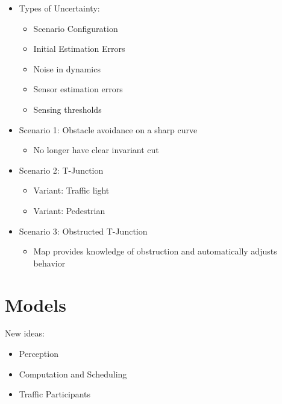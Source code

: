 \documentclass{easychair}
\begin{document}
	
	\begin{itemize}
		\item Types of Uncertainty:
		\begin{itemize}
			\item Scenario Configuration
			\item Initial Estimation Errors
			\item Noise in dynamics
			\item Sensor estimation errors
			\item Sensing thresholds
		\end{itemize}
	\end{itemize}
	\begin{itemize}
		\item Scenario 1: Obstacle avoidance on a sharp curve
		\begin{itemize}
			\item No longer have clear invariant cut
		\end{itemize}
		\item Scenario 2: T-Junction
		\begin{itemize}
			\item Variant: Traffic light
			\item Variant: Pedestrian
		\end{itemize}
		\item Scenario 3: Obstructed T-Junction
		\begin{itemize}
			\item Map provides knowledge of obstruction and automatically adjusts behavior
		\end{itemize}
	\end{itemize}



\section{Models}
\label{sect:model}
New ideas:
\begin{itemize}
	\item Perception
	\item Computation and Scheduling
	\item Traffic Participants
\end{itemize}
\end{document}
